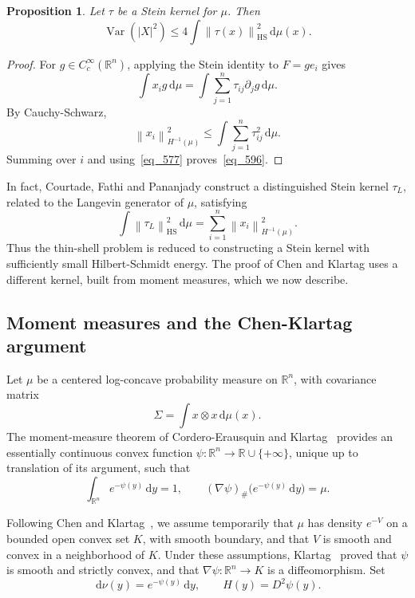 \documentclass[12pt]{article}
\newtheorem{proposition}[theorem]{Proposition}
\theoremstyle{definition}
\theoremstyle{remark}
\newcommand{\R}{\mathbb R}
\newcommand{\Var}{\operatorname{Var}}
\newcommand{\HS}{\mathrm{HS}}
\newcommand{\dd}{\,\mathrm d}
\newcommand{\norm}[1]{\left\lVert #1\right\rVert}
\newcommand{\tauL}{\tau_L}
\begin{document}
\begin{proposition}\label{prop_594}
Let $\tau$ be a Stein kernel for $\mu$. Then
\begin{equation}\label{eq_596}
  \Var(|X|^2)
  \leq
  4\int\norm{\tau(x)}_{\HS}^2\dd\mu(x).
\end{equation}
\end{proposition}

\begin{proof}
For $g\in C_c^\infty(\R^n)$, applying the Stein identity to
$F=ge_i$ gives
\[
  \int x_i g\dd\mu
  =
  \int\sum_{j=1}^n\tau_{ij}\partial_jg\dd\mu.
\]
By Cauchy-Schwarz,
\[
  \norm{x_i}_{H^{-1}(\mu)}^2
  \leq
  \int\sum_{j=1}^n\tau_{ij}^2\dd\mu.
\]
Summing over $i$ and using~\eqref{eq_577}
proves~\eqref{eq_596}.
\end{proof}

In fact, Courtade, Fathi and Pananjady
\cite{CourtadeFathiPananjady} construct a distinguished Stein kernel
$\tauL$, related to the Langevin generator of $\mu$, satisfying
\begin{equation}\label{eq_624}
  \int\norm{\tauL}_{\HS}^2\dd\mu
  =
  \sum_{i=1}^n\norm{x_i}_{H^{-1}(\mu)}^2.
\end{equation}
Thus the thin-shell problem is reduced to constructing a Stein kernel
with sufficiently small Hilbert-Schmidt energy. The proof of Chen and
Klartag uses a different kernel, built from moment measures, which we
now describe.

\subsection{Moment measures and the Chen-Klartag argument}

Let $\mu$ be a centered log-concave probability measure on $\R^n$,
with covariance matrix
\[
  \Sigma=\int x\otimes x\dd\mu(x).
\]
The moment-measure theorem of Cordero-Erausquin and
Klartag~\cite{CorderoKlartag} provides an essentially continuous
convex function $\psi:\R^n\to\R\cup\{+\infty\}$, unique up to
translation of its argument, such that
\begin{equation}\label{eq_645}
  \int_{\R^n}e^{-\psi(y)}\dd y=1,
  \qquad
  (\nabla\psi)_\#\bigl(e^{-\psi(y)}\dd y\bigr)=\mu.
\end{equation}

Following Chen and Klartag~\cite{ChenKlartag}, we assume temporarily
that $\mu$ has density $e^{-V}$ on a bounded open convex set $K$, with
smooth boundary, and that $V$ is smooth and convex in a neighborhood
of $K$. Under these assumptions, Klartag~\cite{KlartagMoment} proved
that $\psi$ is smooth and strictly convex, and that
$\nabla\psi:\R^n\to K$ is a diffeomorphism. Set
\begin{equation}\label{eq_657}
  \dd\nu(y)=e^{-\psi(y)}\dd y,
  \qquad
  H(y)=D^2\psi(y).
\end{equation}
\end{document}
